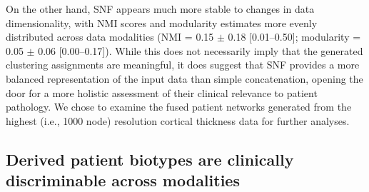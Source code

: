 \documentclass[12pt,aps,pra,reprint,showkeys]{revtex4-1}
\begin{document}
On the other hand, SNF appears much more stable to changes in data dimensionality, with NMI scores and modularity estimates more evenly distributed across data modalities (NMI = 0.15 $\pm$ 0.18 [0.01--0.50]; modularity = 0.05 $\pm$ 0.06 [0.00--0.17]).
While this does not necessarily imply that the generated clustering assignments are meaningful, it does suggest that SNF provides a more balanced representation of the input data than simple concatenation, opening the door for a more holistic assessment of their clinical relevance to patient pathology.
We chose to examine the fused patient networks generated from the highest (i.e., 1000 node) resolution cortical thickness data for further analyses.

\subsection*{Derived patient biotypes are clinically discriminable across modalities}
\end{document}
